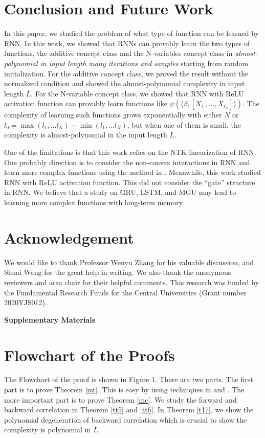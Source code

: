 \documentclass{article}
\begin{document}
\section{Conclusion and Future Work}
In this paper, we studied the problem of what type of function can be learned by RNN. In this work, we showed that RNNs can provably learn the two types of functions, the additive concept class and the N-variables concept class in \emph{almost-polynomial in input length many iterations and samples} starting from random initialization. For the additive concept class, we proved the result without the normalized condition and showed the almost-polynomial complexity in input length $L$. For the N-variable concept class, we showed that RNN with ReLU activation function can provably learn functions like $\psi(\langle \beta,[X_{l_1},...,X_{l_N}]\rangle )$. The complexity of learning such functions grows exponentially with either $N$ or $l_0=\max(l_1,...l_N)- \min(l_1,...l_N)$, but when one of them is small, the complexity is almost-polynomial in the input length $L$.

One of the limitations is that this work relies on the NTK linearization of RNN. One probably direction is to consider the non-convex interactions in RNN and learn more complex functions using the method in \cite{NEURIPS201962dad6e2}. Meanwhile, this work studied RNN with ReLU activation function. This did not consider the ``gate'' structure in RNN. We believe that a study on GRU, LSTM, and MGU may lead to learning more complex functions with long-term memory.

\section*{Acknowledgement}
We would like to thank Professor Wenyu Zhang for his valuable discussion, and Shuai Wang for the great help in writing. We also thank the anonymous reviewers and area chair for their helpful comments.
This research was funded by the Fundamental Research Funds for the Central Universities (Grant number 2020YJS012).





\newpage
\appendix
{\bf \LARGE Supplementary Materials}

\section{Flowchart of the Proofs}

\begin{figure}[omitted: a diagram of this paper's results, not reproduced here]\end{figure}
The Flowchart of the proof is shown in Figure 1. There are two parts. The first part is to prove Theorem \ref{mt}. This is easy by using techniques in \cite{rate} and \cite{cao}. The more important part is to prove Theorem \ref{mc}. We study the forward and backward correlation in Theorem \ref{tt5} and \ref{tt6}. In Theorem \ref{t17}, we show the polynomial degeneration of backward correlation which is crucial to show the complexity is polynomial in $L$.
\end{document}
